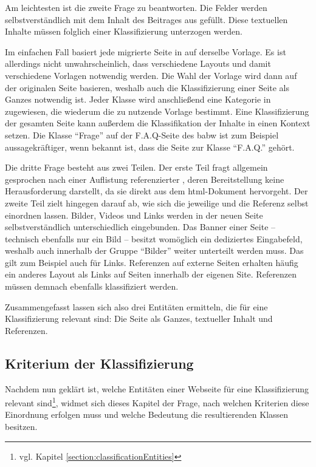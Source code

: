         Am leichtesten ist die zweite Frage zu beantworten.
        Die Felder werden selbstverständlich mit dem Inhalt des Beitrages
        aus {\wordpress} gefüllt.
        Diese textuellen Inhalte müssen folglich einer Klassifizierung unterzogen werden.
        
        Im einfachen Fall basiert jede migrierte Seite in {\imperia} auf derselbe Vorlage.
        Es ist allerdings nicht unwahrscheinlich,
        dass verschiedene Layouts und damit verschiedene Vorlagen
        notwendig werden.
        Die Wahl der Vorlage wird dann auf der originalen Seite basieren,
        weshalb auch die Klassifizierung einer Seite als Ganzes notwendig ist.
        Jeder Klasse wird anschließend eine Kategorie in {\imperia}
        zugewiesen, die wiederum die zu nutzende Vorlage bestimmt.
        Eine Klassifizierung der gesamten Seite kann außerdem die
        Klassifikation der Inhalte in einen Kontext setzen.
        Die Klasse "`Frage"' auf der F.A.Q-Seite des \gls{babw}
        ist zum Beispiel aussagekräftiger, wenn bekannt ist,
        dass die Seite zur Klasse "`F.A.Q."' gehört.

        Die dritte Frage besteht aus zwei Teilen.
        Der erste Teil fragt allgemein gesprochen nach einer Auflistung referenzierter {\resources},
        deren Bereitstellung keine Herausforderung darstellt,
        da sie direkt aus dem \gls{html}-Dokument hervorgeht.
        Der zweite Teil zielt hingegen darauf ab,
        wie sich die jeweilige {\resource} und die Referenz selbst einordnen lassen.
        Bilder, Videos und Links werden in der neuen Seite selbstverständlich
        unterschiedlich eingebunden.
        Das Banner einer Seite -- technisch ebenfalls nur ein Bild --
        besitzt womöglich ein dediziertes Eingabefeld,
        weshalb auch innerhalb der Gruppe "`Bilder"' weiter unterteilt werden muss.
        Das gilt zum Beispiel auch für Links.
        Referenzen auf externe Seiten erhalten häufig ein anderes Layout als Links
        auf Seiten innerhalb der eigenen Site.
        Referenzen müssen demnach ebenfalls klassifiziert werden.

        Zusammengefasst lassen sich also drei Entitäten ermitteln,
        die für eine Klassifizierung relevant sind:
        Die Seite als Ganzes, textueller Inhalt und Referenzen.

    \subsection{Kriterium der Klassifizierung}
        \label{section:ClassificationCriteria}
        Nachdem nun geklärt ist, welche Entitäten einer Webseite für
        eine Klassifizierung relevant sind\footnote{vgl. Kapitel \ref{section:classificationEntities}},
        widmet sich dieses Kapitel der Frage, nach welchen
        Kriterien diese Einordnung erfolgen muss
        und welche Bedeutung die resultierenden Klassen besitzen.

